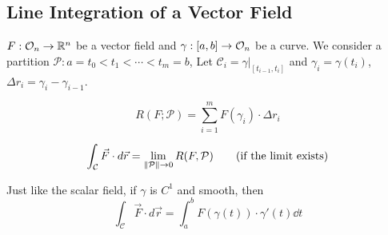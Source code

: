 \documentclass[../Analysis-3.tex]{subfiles}
\begin{document}
\subsection{Line Integration of a Vector Field}

$F:\mathcal{O}_{n} \to \mathbb{R}^n$ be a vector field and $\gamma:[a,b] \to \mathcal{O}_{n}$ be a curve. We consider a partition $\mathcal{P}: a =t_0<t_1<\cdots < t_m=b$, Let $\mathcal{C}_i = \gamma|_{[t_{i-1},t_i]}$ and $\gamma_i = \gamma(t_i)$, $\Delta r_i = \gamma_{i} - \gamma_{i-1}$.

\[R(F;\mathcal{P})= \sum_{i=1}^m F(\gamma_i)\cdot \Delta r_i\]

\begin{align*}
  \int_{\mathcal{C}} \vec{F}\cdot d\vec{r} = \lim_{\norm{\mathcal{P}}\to 0} R(F,\mathcal{P}) \tag{if the limit exists}
\end{align*}

Just like the scalar field, if $\gamma$ is $C^1$ and smooth, then
\begin{equation}
  \int_{\mathcal{C}} \vec{F}\cdot d\vec{r} = \int_a^b F(\gamma(t))\cdot \gamma'(t) \dd t \label{eq:3}
\end{equation}
\end{document}
